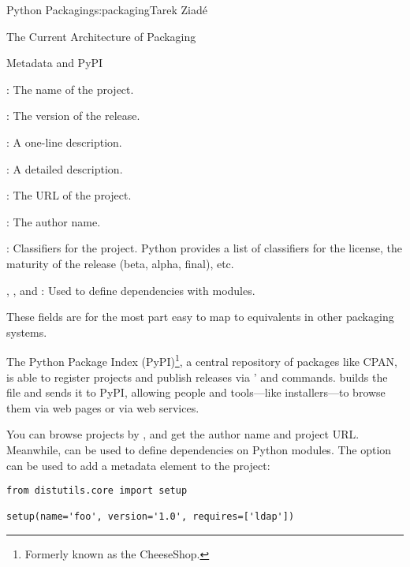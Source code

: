 \begin{aosachapter}{Python Packaging}{s:packaging}{Tarek Ziad\'{e}}
\begin{aosasect1}{The Current Architecture of Packaging}
\begin{aosasect2}{Metadata and PyPI}
\begin{aosaitemize}

  \item {}: The name of the project.

  \item {}: The version of the release.

  \item {}: A one-line description.

  \item {}: A detailed description.

  \item {}: The URL of the project.

  \item {}: The author name.

  \item {}: Classifiers for the project. Python provides a list
  of classifiers for the license, the maturity of the release (beta,
  alpha, final), etc.

  \item {}, , and :
  Used to define dependencies with modules.

\end{aosaitemize}

\noindent
These fields are for the most part easy to map to equivalents in other
packaging systems.

The Python Package Index (PyPI)\footnote{Formerly known as the
CheeseShop.}, a central repository of packages like CPAN, is able to
register projects and publish releases via '
 and  commands.   builds
the  file and sends it to PyPI, allowing people and
tools---like installers---to browse them via web pages or via web
services.


You can browse projects by , and get the author name
and project URL\@.  Meanwhile,  can be used to define
dependencies on Python modules.  The  option can be
used to add a  metadata element to the project:

\begin{verbatim}
from distutils.core import setup

setup(name='foo', version='1.0', requires=['ldap'])
\end{verbatim}


\end{aosasect2}
\end{aosasect1}
\end{aosachapter}
